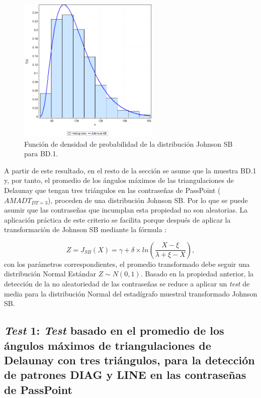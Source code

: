 \documentclass[12pt]{report}
\begin{document}
	  
	 \begin{figure}[htbp]
	 	\centering
	 	
	 	\includegraphics[width=0.6\textwidth]{3td_fdp.png}
	 	\caption{Función de densidad de probabilidad de la  distribución Johnson SB para BD.1.}
	 	\label{3TD_FDP}
	 \end{figure}
	 A partir de este resultado, en el resto de la sección se asume que la muestra BD.1 y, por tanto, el promedio de los ángulos máximos de las triangulaciones de Delaunay que tengan tres triángulos en las contraseñas de PassPoint ($AMADT_{DT=3}$), proceden de una distribución Johnson SB. Por lo que se puede asumir que las contraseñas que incumplan esta propiedad no son aleatorias.
	 La aplicación práctica de este criterio se facilita porque después de  aplicar la transformación de Johnson SB mediante la fórmula \cite{30}:
	 
	  
	 \[
	  Z=J_{SB}(X) = \gamma + \delta \times ln\left(\frac{X - \xi}{\lambda + \xi - X}\right),
	 \]
	 con los parámetros correspondientes, el promedio transformado debe seguir una distribución Normal Estándar $Z\sim N(0,1)$. Basado en la propiedad anterior, la detección de la no aleatoriedad de las contraseñas se reduce a aplicar un \textit{test} de media para la distribución Normal del estadígrafo muestral transformado Johnson SB.
	 
	 
	 
\subsection{\textit{Test} 1: \textit{Test} basado en el promedio de los ángulos máximos de triangulaciones de Delaunay con tres triángulos, para la detección de patrones DIAG y LINE en las contraseñas de PassPoint}
\label{sec:1.2}
\end{document}
